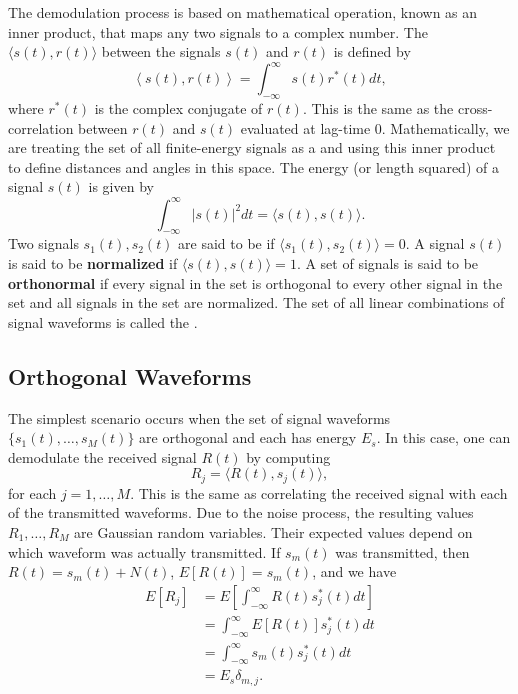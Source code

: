 The demodulation process is based on mathematical operation, known as an inner product, that maps any two signals to a complex number.
The  $\langle s(t) , r(t) \rangle$ between the signals $s(t)$ and $r(t)$ is defined by
\begin{equation*}
\left\langle s (t), r (t) \right\rangle
= \int_{-\infty}^{\infty} s(t) r^* (t) dt,
\end{equation*}
where $r^* (t)$ is the complex conjugate of $r(t)$.
This is the same as the cross-correlation between $r(t)$ and $s(t)$ evaluated at lag-time 0.
Mathematically, we are treating the set of all finite-energy signals as a  and using this inner product to define distances and angles in this space.
The energy (or length squared) of a signal $s(t)$ is given by
\[ \int_{-\infty}^{\infty} \left| s(t) \right|^2 dt = \langle s(t),s(t) \rangle. \]
Two signals $s_1 (t),s_2 (t)$ are said to be  if $\langle s_1(t),s_2 (t)\rangle = 0$.
A signal $s(t)$ is said to be \textbf{normalized} if $\langle s(t),s(t) \rangle = 1$.
A set of signals is said to be \textbf{orthonormal} if every signal in the set is orthogonal to every other signal in the set and all signals in the set are normalized.
The set of all linear combinations of signal waveforms is called the .

\subsection{Orthogonal Waveforms}
The simplest scenario occurs when the set of signal waveforms $\{ s_1 (t), \ldots , s_M (t) \}$ are orthogonal and each has energy $E_s$.
In this case, one can demodulate the received signal $R(t)$ by computing
\[ R_j = \langle R(t), s_j (t) \rangle, \]
for each $j=1,\ldots,M$.
This is the same as correlating the received signal with each of the transmitted waveforms.
Due to the noise process, the resulting values $R_1 , \ldots, R_M$ are Gaussian random variables.
Their expected values depend on which waveform was actually transmitted.
If $s_m (t)$ was transmitted, then $R(t) = s_m(t) + N(t)$, $E[R(t)] = s_m(t)$, and we have
\begin{align*}
E \left[R_j \right]
&= E \left[ \int_{-\infty}^{\infty} R(t) s_j^* (t) dt \right] \\
&= \int_{-\infty}^{\infty} E \left[ R(t) \right] s_j^* (t) dt \\
&= \int_{-\infty}^{\infty} s_m (t) s_j^* (t) dt \\
&= E_s \delta_{m,j}.
\end{align*}

